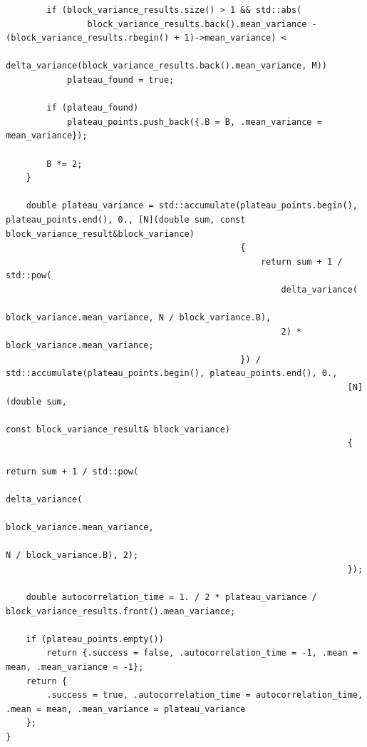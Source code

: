\documentclass[a4paper, 11pt]{article}          %
\begin{document}
\begin{landscape}
\begin{lstlisting}
        if (block_variance_results.size() > 1 && std::abs(
                block_variance_results.back().mean_variance - (block_variance_results.rbegin() + 1)->mean_variance) <
            delta_variance(block_variance_results.back().mean_variance, M))
            plateau_found = true;

        if (plateau_found)
            plateau_points.push_back({.B = B, .mean_variance = mean_variance});

        B *= 2;
    }

    double plateau_variance = std::accumulate(plateau_points.begin(), plateau_points.end(), 0., [N](double sum, const block_variance_result&block_variance)
                                              {
                                                  return sum + 1 / std::pow(
                                                      delta_variance(
                                                          block_variance.mean_variance, N / block_variance.B),
                                                      2) * block_variance.mean_variance;
                                              }) / std::accumulate(plateau_points.begin(), plateau_points.end(), 0.,
                                                                   [N](double sum,
                                                                       const block_variance_result& block_variance)
                                                                   {
                                                                       return sum + 1 / std::pow(
                                                                           delta_variance(
                                                                               block_variance.mean_variance,
                                                                               N / block_variance.B), 2);
                                                                   });

    double autocorrelation_time = 1. / 2 * plateau_variance / block_variance_results.front().mean_variance;

    if (plateau_points.empty())
        return {.success = false, .autocorrelation_time = -1, .mean = mean, .mean_variance = -1};
    return {
        .success = true, .autocorrelation_time = autocorrelation_time, .mean = mean, .mean_variance = plateau_variance
    };
}

    \end{lstlisting}
    \end{landscape}

    \printbibliography

\end{document}
